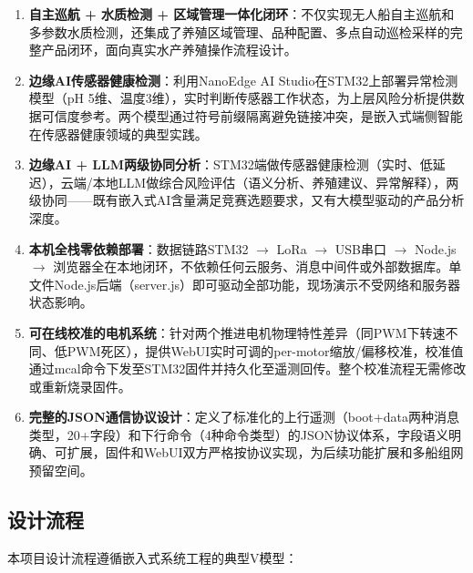 \documentclass[12pt,a4paper]{ctexart}
\begin{document}
\begin{enumerate}[label=\arabic*.]
    \item \textbf{自主巡航 + 水质检测 + 区域管理一体化闭环}：不仅实现无人船自主巡航和多参数水质检测，还集成了养殖区域管理、品种配置、多点自动巡检采样的完整产品闭环，面向真实水产养殖操作流程设计。

    \item \textbf{边缘AI传感器健康检测}：利用NanoEdge AI Studio在STM32上部署异常检测模型（pH 5维、温度3维），实时判断传感器工作状态，为上层风险分析提供数据可信度参考。两个模型通过符号前缀隔离避免链接冲突，是嵌入式端侧智能在传感器健康领域的典型实践。

    \item \textbf{边缘AI + LLM两级协同分析}：STM32端做传感器健康检测（实时、低延迟），云端/本地LLM做综合风险评估（语义分析、养殖建议、异常解释），两级协同——既有嵌入式AI含量满足竞赛选题要求，又有大模型驱动的产品分析深度。

    \item \textbf{本机全栈零依赖部署}：数据链路STM32 $\rightarrow$ LoRa $\rightarrow$ USB串口 $\rightarrow$ Node.js $\rightarrow$ 浏览器全在本地闭环，不依赖任何云服务、消息中间件或外部数据库。单文件Node.js后端（server.js）即可驱动全部功能，现场演示不受网络和服务器状态影响。

    \item \textbf{可在线校准的电机系统}：针对两个推进电机物理特性差异（同PWM下转速不同、低PWM死区），提供WebUI实时可调的per-motor缩放/偏移校准，校准值通过mcal命令下发至STM32固件并持久化至遥测回传。整个校准流程无需修改或重新烧录固件。

    \item \textbf{完整的JSON通信协议设计}：定义了标准化的上行遥测（boot+data两种消息类型，20+字段）和下行命令（4种命令类型）的JSON协议体系，字段语义明确、可扩展，固件和WebUI双方严格按协议实现，为后续功能扩展和多船组网预留空间。
\end{enumerate}

\subsection{设计流程}

本项目设计流程遵循嵌入式系统工程的典型V模型：
\end{document}
